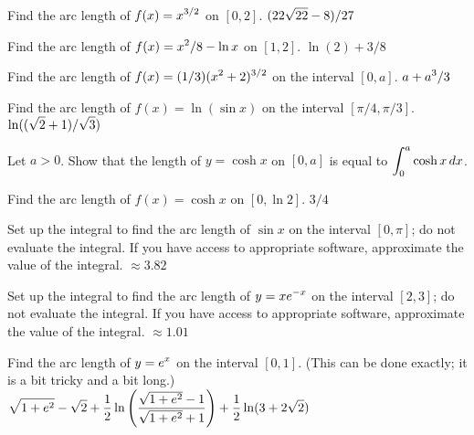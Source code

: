 \exercises

\exercise Find the arc length of $\displaystyle f(x)=x^{3/2}$ on $[0,2]$.
\answer $\displaystyle (22\sqrt{22}-8)/27$
\endanswer
\endexercise

\exercise Find the arc length of $\displaystyle f(x) = x^2/8-\ln x$
on $[1,2]$.
\answer $\ln(2)+3/8$
\endanswer
\endexercise

\exercise
Find the arc length of $\displaystyle f(x) = (1/3)(x^2 +2)^{3/2}$
on the interval $[0,a]$.
\answer $\displaystyle a+a^3/3$
\endanswer
\endexercise

\exercise Find the arc length of $f(x)=\ln(\sin x)$ on the
interval $[\pi/4,\pi/3]$.
\answer $\displaystyle \ln((\sqrt2+1)/\sqrt3)$
\endanswer
\endexercise

\exercise Let $a>0$. Show that the length of $y=\cosh x$ on
$[0,a]$ is equal to $\displaystyle \int _0 ^a \cosh x\,dx$.
\endexercise

\exercise Find the arc length of $f(x)=\cosh x$ on $[0, \ln 2]$.
\answer $3/4$
\endanswer
\endexercise

\exercise Set up the integral to find the arc length of $\sin x$ 
on the interval $[0,\pi]$; do not evaluate the integral. If you have
access to appropriate software, approximate the value of the integral.
\answer $\approx 3.82$
\endanswer
\endexercise

\exercise Set up the integral to find the arc length of $\displaystyle y=xe^{-x}$
on the interval $[2,3]$; do not evaluate the integral. If you have
access to appropriate software, approximate the value of the integral.
\answer $\approx 1.01$
\endanswer
\endexercise

\exercise Find the arc length of $\displaystyle y=e^x$ on the interval $[0,1]$.
(This can be done exactly; it is a bit tricky and a bit long.)
\answer $\displaystyle \sqrt{1+e^2}-\sqrt2+
{1\over2}\ln\left({\sqrt{1+e^2}-1\over\sqrt{1+e^2}+1}\right)+
{1\over2}\ln(3+2\sqrt2)$
\endanswer
\endexercise

\endexercises
